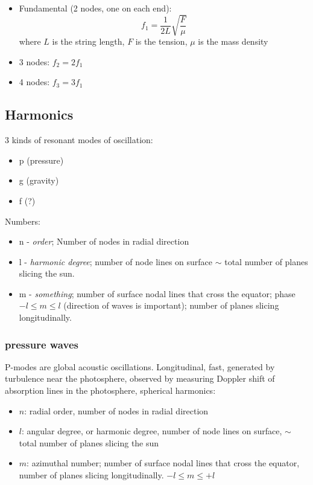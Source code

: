 \documentclass{article}
\begin{document}
\begin{itemize}
    \item Fundamental (2 nodes, one on each end):
        \[
            f_{1} = \frac{1}{2L}\sqrt{\frac{F}{\mu}}
            \]
        where $L$ is the string length, $F$ is the tension,
        $\mu$ is the mass density
    \item 3 nodes: $f_{2} = 2f_{1}$
    \item 4 nodes: $f_{3} = 3f_{1}$
\end{itemize}

\subsection{Harmonics}
3 kinds of resonant modes of oscillation:
\begin{itemize}
    \item p (pressure)
    \item g (gravity)
    \item f (?)
\end{itemize}
Numbers:
\begin{itemize}
    \item n - \emph{order}; Number of nodes in radial direction
    \item l - \emph{harmonic degree}; number of node lines on
        surface $\sim$ total number of planes slicing the sun.
    \item m - \emph{something}; number of surface nodal lines that
        cross the equator; phase\\
        $-l \leq m \leq l$ (direction of waves is important); number of
        planes slicing longitudinally.
\end{itemize}
\subsubsection{pressure waves}
P-modes are global acoustic oscillations.
Longitudinal, fast, generated by turbulence near the photosphere,
observed by measuring Doppler shift of absorption lines in the
photosphere, spherical harmonics:
\begin{itemize}
    \item $n$: radial order, number of nodes in radial direction
    \item $l$: angular degree, or harmonic degree,
        number of node lines on surface,
        $\sim$ total number of planes slicing the sun
    \item $m$: azimuthal number;
        number of surface nodal lines that cross the equator,
        number of planes slicing longitudinally. $-l\leq m\leq +l$
\end{itemize}
\end{document}
